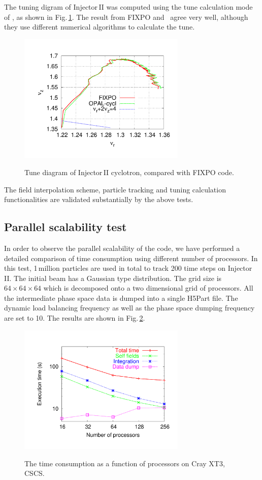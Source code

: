 \documentclass[aps,prstab,twocolumn,superscriptaddress]{revtex4}
\begin{document}
The tuning digram of Injector\,II was computed using the tune calculation mode of \opalcycl, as shown in Fig.\,\ref{fig:nurnuz_Inj2}.
The result from FIXPO and \opalcycl \ agree very well, although they use different numerical algorithms to calculate the tune. 
\begin{figure}
  {\includegraphics[width=8cm,trim=2.5cm 2.5cm 2.5cm 2.5cm]{figures/nurnuz_Inj2.pdf}}
  \caption{Tune diagram of Injector\,II cyclotron, compared with FIXPO code.}
  \label{fig:nurnuz_Inj2}
\end{figure}

The field interpolation scheme, particle tracking and tuning calculation functionalities are validated substantially by the above tests. 
\subsection{Parallel scalability test}
In order to observe the parallel scalability of the code, we have performed a detailed comparison of time consumption using different number of processors. 
In this test, 1\,million particles are used in total to track 200 time steps on Injector\,II. The initial beam has a Gaussian
type distribution. The grid size is $64 \times 64 \times 64$ which is decomposed onto a two dimensional grid of processors. All the intermediate phase space data is dumped into 
a single H5Part file. The dynamic load balancing frequency as well as the phase space dumping frequency are set to 10.
The results are shown in Fig.\,\ref{scalability}.
\begin{figure}
  {\includegraphics[width=8cm,trim=0cm 0cm 0cm 0cm]{figures/Timing64mesh.pdf}}
  \caption{The time consumption as a function of processors on Cray XT3, CSCS.}
  \label{scalability}
\end{figure}
\end{document}
